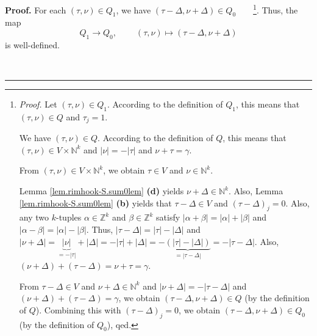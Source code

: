 \documentclass[numbers=enddot,12pt,final,onecolumn,notitlepage]{scrartcl}%
\theoremstyle{definition}
\newenvironment{proof}[1][Proof]{\noindent\textbf{#1.} }{\ \rule{0.5em}{0.5em}}
\begin{document}
\begin{proof}
For each $\left(  \tau,\nu\right)  \in Q_{1}$, we have $\left(  \tau
-\Delta,\nu+\Delta\right)  \in Q_{0}$\ \ \ \ \footnote{\textit{Proof.} Let
$\left(  \tau,\nu\right)  \in Q_{1}$. According to the definition of $Q_{1}$,
this means that $\left(  \tau,\nu\right)  \in Q$ and $\tau_{j}=1$.
\par
We have $\left(  \tau,\nu\right)  \in Q$. According to the definition of $Q$,
this means that $\left(  \tau,\nu\right)  \in V\times\mathbb{N}^{k}$ and
$\left\vert \nu\right\vert =-\left\vert \tau\right\vert $ and $\nu+\tau
=\gamma$.
\par
From $\left(  \tau,\nu\right)  \in V\times\mathbb{N}^{k}$, we obtain $\tau\in
V$ and $\nu\in\mathbb{N}^{k}$.
\par
Lemma \ref{lem.rimhook-S.sum0lem} \textbf{(d)} yields $\nu+\Delta\in
\mathbb{N}^{k}$. Also, Lemma \ref{lem.rimhook-S.sum0lem} \textbf{(b)} yields
that $\tau-\Delta\in V$ and $\left(  \tau-\Delta\right)  _{j}=0$. Also, any
two $k$-tuples $\alpha\in\mathbb{Z}^{k}$ and $\beta\in\mathbb{Z}^{k}$ satisfy
$\left\vert \alpha+\beta\right\vert =\left\vert \alpha\right\vert +\left\vert
\beta\right\vert $ and $\left\vert \alpha-\beta\right\vert =\left\vert
\alpha\right\vert -\left\vert \beta\right\vert $. Thus, $\left\vert
\tau-\Delta\right\vert =\left\vert \tau\right\vert -\left\vert \Delta
\right\vert $ and $\left\vert \nu+\Delta\right\vert =\underbrace{\left\vert
\nu\right\vert }_{=-\left\vert \tau\right\vert }+\left\vert \Delta\right\vert
=-\left\vert \tau\right\vert +\left\vert \Delta\right\vert
=-\underbrace{\left(  \left\vert \tau\right\vert -\left\vert \Delta\right\vert
\right)  }_{=\left\vert \tau-\Delta\right\vert }=-\left\vert \tau
-\Delta\right\vert $. Also, $\left(  \nu+\Delta\right)  +\left(  \tau
-\Delta\right)  =\nu+\tau=\gamma$.
\par
From $\tau-\Delta\in V$ and $\nu+\Delta\in\mathbb{N}^{k}$ and $\left\vert
\nu+\Delta\right\vert =-\left\vert \tau-\Delta\right\vert $ and $\left(
\nu+\Delta\right)  +\left(  \tau-\Delta\right)  =\gamma$, we obtain $\left(
\tau-\Delta,\nu+\Delta\right)  \in Q$ (by the definition of $Q$). Combining
this with $\left(  \tau-\Delta\right)  _{j}=0$, we obtain $\left(  \tau
-\Delta,\nu+\Delta\right)  \in Q_{0}$ (by the definition of $Q_{0}$), qed.}.
Thus, the map%
\begin{equation}
Q_{1}\rightarrow Q_{0},\ \ \ \ \ \ \ \ \ \ \left(  \tau,\nu\right)
\mapsto\left(  \tau-\Delta,\nu+\Delta\right)
\label{pf.lem.rimhook-S.sum0.map2}%
\end{equation}
is well-defined.


\end{proof}
\end{document}
